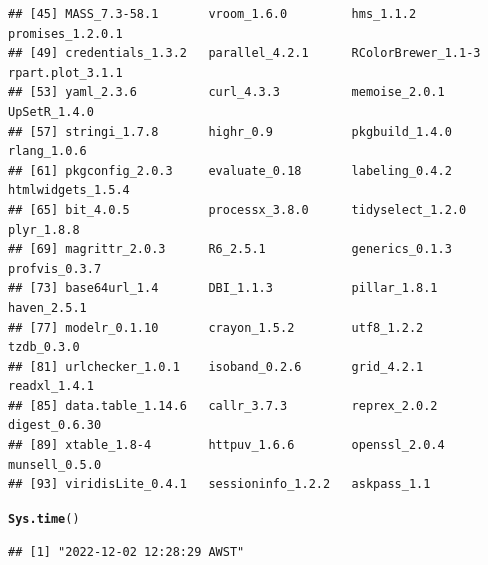 \documentclass{article}\usepackage[]{graphicx}\usepackage[]{xcolor}
\makeatletter
\newcommand{\hlstd}[1]{\textcolor[rgb]{0.345,0.345,0.345}{#1}}%
\newcommand{\hlkwd}[1]{\textcolor[rgb]{0.737,0.353,0.396}{\textbf{#1}}}%
\newenvironment{kframe}{%
 \def\at@end@of@kframe{}%
 \ifinner\ifhmode%
  \def\at@end@of@kframe{\end{minipage}}%
  \begin{minipage}{\columnwidth}%
 \fi\fi%
 \def\FrameCommand##1{\hskip\@totalleftmargin \hskip-\fboxsep
 \colorbox{shadecolor}{##1}\hskip-\fboxsep
     \hskip-\linewidth \hskip-\@totalleftmargin \hskip\columnwidth}%
 \MakeFramed {\advance\hsize-\width
   \@totalleftmargin\z@ \linewidth\hsize
   \@setminipage}}%
 {\par\unskip\endMakeFramed%
 \at@end@of@kframe}
\newenvironment{knitrout}{}{} %
\makeatother
\begin{document}
\begin{knitrout}
\begin{kframe}
\begin{verbatim}
## [45] MASS_7.3-58.1       vroom_1.6.0         hms_1.1.2           promises_1.2.0.1   
## [49] credentials_1.3.2   parallel_4.2.1      RColorBrewer_1.1-3  rpart.plot_3.1.1   
## [53] yaml_2.3.6          curl_4.3.3          memoise_2.0.1       UpSetR_1.4.0       
## [57] stringi_1.7.8       highr_0.9           pkgbuild_1.4.0      rlang_1.0.6        
## [61] pkgconfig_2.0.3     evaluate_0.18       labeling_0.4.2      htmlwidgets_1.5.4  
## [65] bit_4.0.5           processx_3.8.0      tidyselect_1.2.0    plyr_1.8.8         
## [69] magrittr_2.0.3      R6_2.5.1            generics_0.1.3      profvis_0.3.7      
## [73] base64url_1.4       DBI_1.1.3           pillar_1.8.1        haven_2.5.1        
## [77] modelr_0.1.10       crayon_1.5.2        utf8_1.2.2          tzdb_0.3.0         
## [81] urlchecker_1.0.1    isoband_0.2.6       grid_4.2.1          readxl_1.4.1       
## [85] data.table_1.14.6   callr_3.7.3         reprex_2.0.2        digest_0.6.30      
## [89] xtable_1.8-4        httpuv_1.6.6        openssl_2.0.4       munsell_0.5.0      
## [93] viridisLite_0.4.1   sessioninfo_1.2.2   askpass_1.1
\end{verbatim}
\begin{alltt}
\hlkwd{Sys.time}\hlstd{()}
\end{alltt}
\begin{verbatim}
## [1] "2022-12-02 12:28:29 AWST"
\end{verbatim}
\end{kframe}
\end{knitrout}
\end{document}
